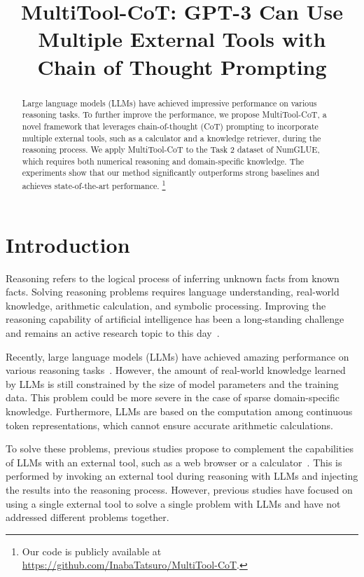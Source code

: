 \title{MultiTool-CoT: GPT-3 Can Use Multiple External Tools with Chain of Thought Prompting}



\maketitle
\begin{abstract}

Large language models (LLMs) have achieved impressive performance on various reasoning tasks.
To further improve the performance, we propose MultiTool-CoT, a novel framework that leverages chain-of-thought (CoT) prompting to incorporate multiple external tools, such as a calculator and a knowledge retriever, during the reasoning process.
We apply MultiTool-CoT to the Task 2 dataset of NumGLUE, which requires both numerical reasoning and domain-specific knowledge.
The experiments show that our method significantly outperforms strong baselines and achieves state-of-the-art performance.
\footnote{Our code is publicly available at \url{https://github.com/InabaTatsuro/MultiTool-CoT}.}

\end{abstract}

\section{Introduction}

Reasoning refers to the logical process of inferring unknown facts from known facts.
Solving reasoning problems requires language understanding, real-world knowledge, arithmetic calculation, and symbolic processing.
Improving the reasoning capability of artificial intelligence has been a long-standing challenge and remains an active research topic to this day~\cite{gordon-etal-2012-semeval,sap-etal-2020-commonsense}.

Recently, large language models (LLMs) have achieved amazing performance on various reasoning tasks~\cite{GPT-3,lewkowycz2022solving,opt,palm}.
However, the amount of real-world knowledge learned by LLMs is still constrained by the size of model parameters and the training data.
This problem could be more severe in the case of sparse domain-specific knowledge.
Furthermore, LLMs are based on the computation among continuous token representations, which cannot ensure accurate arithmetic calculations.

To solve these problems, previous studies propose to complement the capabilities of LLMs with an external tool, such as a web browser or a calculator~\cite{2021-nakano-webgpt,dentaku,ReAct}.
This is performed by invoking an external tool during reasoning with LLMs and injecting the results into the reasoning process.
However, previous studies have focused on using a single external tool to solve a single problem with LLMs and have not addressed different problems together.

